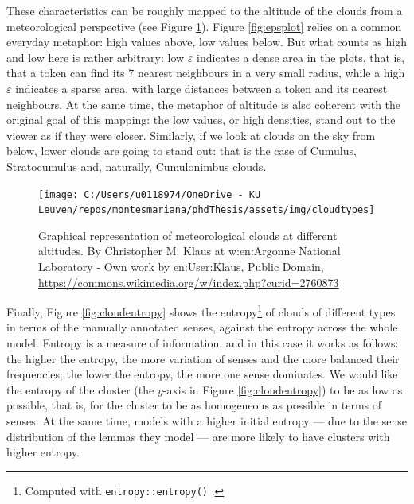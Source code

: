 \documentclass[
]{book}
\begin{document}
These characteristics can be roughly mapped to the altitude of the clouds from a meteorological perspective (see Figure \ref{fig:cloudtypes}). Figure \ref{fig:epsplot} relies on a common everyday metaphor: high values above, low values below. But what counts as high and low here is rather arbitrary: low \(\varepsilon\) indicates a dense area in the plots, that is, that a token can find its 7 nearest neighbours in a very small radius, while a high \(\varepsilon\) indicates a sparse area, with large distances between a token and its nearest neighbours. At the same time, the metaphor of altitude is also coherent with the original goal of this mapping: the low values, or high densities, stand out to the viewer as if they were closer. Similarly, if we look at clouds on the sky from below, lower clouds are going to stand out: that is the case of Cumulus, Stratocumulus and, naturally, Cumulonimbus clouds.



\begin{figure}
\texttt{[image: C:/Users/u0118974/OneDrive - KU Leuven/repos/montesmariana/phdThesis/assets/img/cloudtypes]} \caption{Graphical representation of meteorological clouds at different altitudes. By Christopher M. Klaus at w:en:Argonne National Laboratory - Own work by en:User:Klaus, Public Domain, \url{https://commons.wikimedia.org/w/index.php?curid=2760873}}\label{fig:cloudtypes}
\end{figure}

Finally, Figure \ref{fig:cloudentropy} shows the entropy\footnote{Computed with \texttt{entropy::entropy()} \autocite{R-entropy}.} of clouds of different types in terms of the manually annotated senses, against the entropy across the whole model. Entropy is a measure of information, and in this case it works as follows: the higher the entropy, the more variation of senses and the more balanced their frequencies; the lower the entropy, the more one sense dominates. We would like the entropy of the cluster (the \(y\)-axis in Figure \ref{fig:cloudentropy}) to be as low as possible, that is, for the cluster to be as homogeneous as possible in terms of senses. At the same time, models with a higher initial entropy --- due to the sense distribution of the lemmas they model --- are more likely to have clusters with higher entropy.
\end{document}
